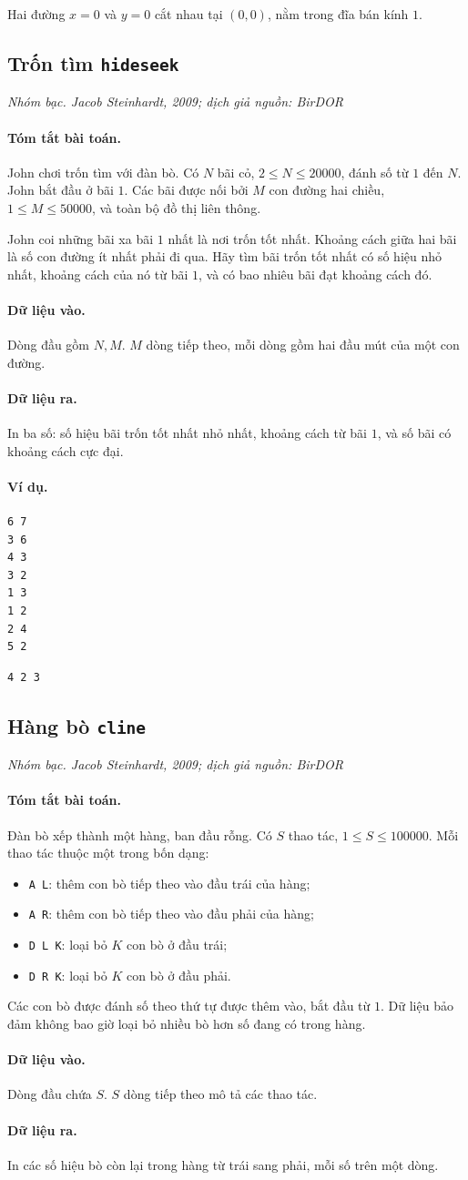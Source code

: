 \documentclass[11pt]{article}
\newcommand{\problem}[4]{%
  \subsection[#1 (#2)]{#1 \hfill {\normalsize\texttt{#2}}}%
  \noindent\textit{#3. #4}\par\smallskip
}
\newcommand{\iosec}[1]{\paragraph{#1}}
\begin{document}
Hai đường \(x=0\) và \(y=0\) cắt nhau tại \((0,0)\), nằm trong đĩa bán kính
\(1\).

\problem{Trốn tìm}{hideseek}{Nhóm bạc}{Jacob Steinhardt, 2009; dịch giả nguồn: BirDOR}

\iosec{Tóm tắt bài toán.}
John chơi trốn tìm với đàn bò. Có \(N\) bãi cỏ, \(2\le N\le 20000\), đánh số
từ \(1\) đến \(N\). John bắt đầu ở bãi \(1\). Các bãi được nối bởi \(M\)
con đường hai chiều, \(1\le M\le 50000\), và toàn bộ đồ thị liên thông.

John coi những bãi xa bãi \(1\) nhất là nơi trốn tốt nhất. Khoảng cách giữa
hai bãi là số con đường ít nhất phải đi qua. Hãy tìm bãi trốn tốt nhất có số
hiệu nhỏ nhất, khoảng cách của nó từ bãi \(1\), và có bao nhiêu bãi đạt
khoảng cách đó.

\iosec{Dữ liệu vào.}
Dòng đầu gồm \(N,M\). \(M\) dòng tiếp theo, mỗi dòng gồm hai đầu mút của một
con đường.

\iosec{Dữ liệu ra.}
In ba số: số hiệu bãi trốn tốt nhất nhỏ nhất, khoảng cách từ bãi \(1\), và
số bãi có khoảng cách cực đại.

\iosec{Ví dụ.}
\begin{verbatim}
6 7
3 6
4 3
3 2
1 3
1 2
2 4
5 2
\end{verbatim}

\begin{verbatim}
4 2 3
\end{verbatim}

\problem{Hàng bò}{cline}{Nhóm bạc}{Jacob Steinhardt, 2009; dịch giả nguồn: BirDOR}

\iosec{Tóm tắt bài toán.}
Đàn bò xếp thành một hàng, ban đầu rỗng. Có \(S\) thao tác,
\(1\le S\le 100000\). Mỗi thao tác thuộc một trong bốn dạng:
\begin{itemize}
\item \texttt{A L}: thêm con bò tiếp theo vào đầu trái của hàng;
\item \texttt{A R}: thêm con bò tiếp theo vào đầu phải của hàng;
\item \texttt{D L K}: loại bỏ \(K\) con bò ở đầu trái;
\item \texttt{D R K}: loại bỏ \(K\) con bò ở đầu phải.
\end{itemize}
Các con bò được đánh số theo thứ tự được thêm vào, bắt đầu từ \(1\). Dữ liệu
bảo đảm không bao giờ loại bỏ nhiều bò hơn số đang có trong hàng.

\iosec{Dữ liệu vào.}
Dòng đầu chứa \(S\). \(S\) dòng tiếp theo mô tả các thao tác.

\iosec{Dữ liệu ra.}
In các số hiệu bò còn lại trong hàng từ trái sang phải, mỗi số trên một dòng.
\end{document}
